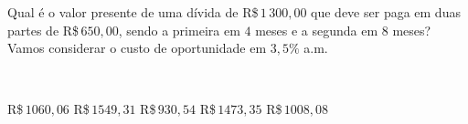 \parbox{\linewidth}{

Qual é o valor presente de uma dívida de R\$\,$1\,300{,}00$ que deve ser paga em duas partes de R\$\,$650{,}00$, sendo a primeira em $4$ meses e a segunda em $8$ meses? Vamos considerar o custo de oportunidade em $3{,}5\%$ a.m.}\vspace{2mm}\\\parbox{\linewidth}{

R\$\,$   1060{,}06$
R\$\,$   1549{,}31$
R\$\,$    930{,}54$
R\$\,$   1473{,}35$
R\$\,$   1008{,}08$

}

